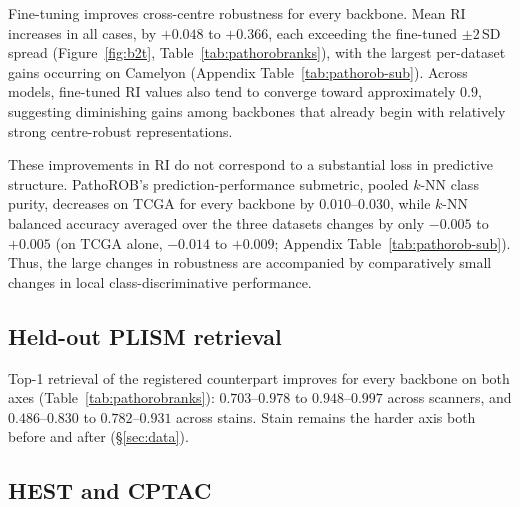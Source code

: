 \documentclass{article}
\begin{document}
Fine-tuning improves cross-centre robustness for every backbone. Mean RI increases in all cases, by $+0.048$ to $+0.366$, each exceeding the fine-tuned $\pm2$\,SD spread (Figure~\ref{fig:b2t}, Table~\ref{tab:pathorobranks}), with the largest per-dataset gains occurring on Camelyon (Appendix Table~\ref{tab:pathorob-sub}). Across models, fine-tuned RI values also tend to converge toward approximately $0.9$, suggesting diminishing gains among backbones that already begin with relatively strong centre-robust representations.

These improvements in RI do not correspond to a substantial loss in predictive structure. PathoROB's prediction-performance submetric, pooled $k$-NN class purity, decreases on TCGA for every backbone by $0.010$--$0.030$, while $k$-NN balanced accuracy averaged over the three datasets changes by only $-0.005$ to $+0.005$ (on TCGA alone, $-0.014$ to $+0.009$; Appendix Table~\ref{tab:pathorob-sub}). Thus, the large changes in robustness are accompanied by comparatively small changes in local class-discriminative performance.

\subsection{Held-out PLISM retrieval}

Top-1 retrieval of the registered counterpart improves for every backbone on both axes
(Table~\ref{tab:pathorobranks}): $0.703$--$0.978$ to $0.948$--$0.997$ across scanners, and
$0.486$--$0.830$ to $0.782$--$0.931$ across stains. Stain remains the harder axis both before
and after (\S\ref{sec:data}).


\subsection{HEST and CPTAC}

\begin{table}[htbp]
\caption{HEST/CPTAC performance: base $\to$ fine-tuned. HEST is mean Pearson $r$ over nine tasks with the
rank sum over those tasks and the positional rank in the 26-model published field; CPTAC is
macro-OvR AUC over 38 Patho-Bench classification tasks. Per-task results are in
Appendix Tables~\ref{tab:hestranks}, \ref{tab:cptac-per-task} respectively to HEST and CPTAC.}
\label{tab:hestcptac}
\centering
\small
\setlength{\tabcolsep}{4pt}
\renewcommand{\arraystretch}{0.95}

\end{table}
\end{document}
